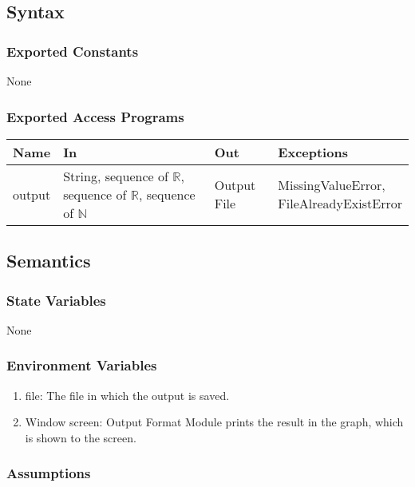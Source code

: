 \documentclass[12pt, titlepage]{article}
\begin{document}
\subsection{Syntax}

\subsubsection{Exported Constants}
None 
\subsubsection{Exported Access Programs}


\begin{tabular}{p{2cm} p{5.5cm} p{3cm} p{3.5cm}}
\hline
\textbf{Name} & \textbf{In} & \textbf{Out} & \textbf{Exceptions} \\
\hline
output & \makecell[l]{String, \\ sequence of $\mathbb{R}$, \\ sequence of $\mathbb{R}$, \\ sequence of $\mathbb{N}$ } & Output File & \makecell[l]{MissingValueError, \\ FileAlreadyExistError} \\
\hline
\end{tabular}

\subsection{Semantics}

\subsubsection{State Variables}

None

\subsubsection{Environment Variables}

\begin{enumerate}
    \item file: The file in which the output is saved. 
    \item Window screen: Output Format Module prints the result in the graph, which is shown to the screen. 
\end{enumerate}


\subsubsection{Assumptions}
\end{document}
